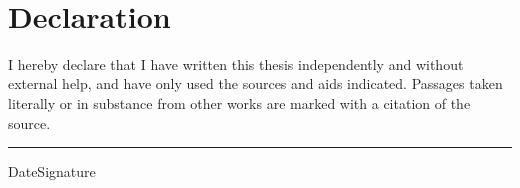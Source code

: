 

%

\maketitle
\clearpage

~ %
\newpage


\clearpage


\vspace{10ex}
\section*{Declaration}
I hereby declare that I have written this thesis independently and without external help, and have only used the sources and aids indicated. Passages taken literally or in substance from other works are marked with a citation of the source.
\vspace{10ex}\\

\hrule
{\small{Date}}\hfill{\small{Signature}}

\tableofcontents
\listoffigures


%